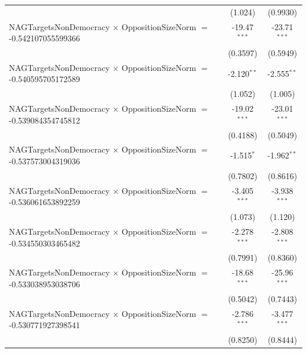 \begin{tabular}{lcc}
                                                                                & (1.024)              & (0.9930)\\   
   NAGTargetsNonDemocracy $\times$ OppositionSizeNorm $=$ -0.542107055599366    & -19.47$^{***}$       & -23.71$^{***}$\\   
                                                                                & (0.3597)             & (0.5949)\\   
   NAGTargetsNonDemocracy $\times$ OppositionSizeNorm $=$ -0.540595705172589    & -2.120$^{**}$        & -2.555$^{**}$\\   
                                                                                & (1.052)              & (1.005)\\   
   NAGTargetsNonDemocracy $\times$ OppositionSizeNorm $=$ -0.539084354745812    & -19.02$^{***}$       & -23.01$^{***}$\\   
                                                                                & (0.4188)             & (0.5049)\\   
   NAGTargetsNonDemocracy $\times$ OppositionSizeNorm $=$ -0.537573004319036    & -1.515$^{*}$         & -1.962$^{**}$\\   
                                                                                & (0.7802)             & (0.8616)\\   
   NAGTargetsNonDemocracy $\times$ OppositionSizeNorm $=$ -0.536061653892259    & -3.405$^{***}$       & -3.938$^{***}$\\   
                                                                                & (1.073)              & (1.120)\\   
   NAGTargetsNonDemocracy $\times$ OppositionSizeNorm $=$ -0.534550303465482    & -2.278$^{***}$       & -2.808$^{***}$\\   
                                                                                & (0.7991)             & (0.8360)\\   
   NAGTargetsNonDemocracy $\times$ OppositionSizeNorm $=$ -0.533038953038706    & -18.68$^{***}$       & -25.96$^{***}$\\   
                                                                                & (0.5042)             & (0.7443)\\   
   NAGTargetsNonDemocracy $\times$ OppositionSizeNorm $=$ -0.530771927398541    & -2.786$^{***}$       & -3.477$^{***}$\\   
                                                                                & (0.8250)             & (0.8444)\\   

\end{tabular}
